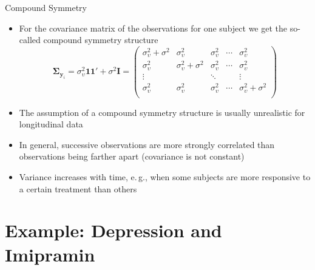 \documentclass[aspectratio=169]{beamer}
\newcommand{\vect}[1]{\mathbf{#1}}
\newcommand{\mat}[1]{\mathbf{#1}}
\newcommand{\gvect}[1]{\boldsymbol{#1}}
\begin{document}
\begin{frame}{Compound Symmetry}
  \begin{itemize}
    \item For the covariance matrix of the observations for
      one subject we get the so-called compound symmetry structure
\[
  \gvect{\Sigma}_{\vect{y}_i} = \sigma^2_\upsilon \vect{1} \vect{1}'
    + \sigma^2 \mat{I}
  = 
  \begin{pmatrix}
    \sigma^2_\upsilon + \sigma^2 & \sigma^2_\upsilon & \sigma^2_\upsilon &
      \cdots & \sigma^2_\upsilon \\
    \sigma^2_\upsilon & \sigma^2_\upsilon  + \sigma^2 & \sigma^2_\upsilon &
      \cdots & \sigma^2_\upsilon \\
    \vdots & & \ddots & & \vdots \\
    \sigma^2_\upsilon & \sigma^2_\upsilon  & \sigma^2_\upsilon &
      \cdots & \sigma^2_\upsilon + \sigma^2 \\
  \end{pmatrix}
\]
    \item The assumption of a compound symmetry structure is usually
      unrealistic for longitudinal data
    \item In general, successive observations are more strongly correlated
      than observations being farther apart (covariance is not constant)
    \item Variance increases with time, e.\,g., when some subjects are more
      responsive to a certain treatment than others
  \end{itemize}
\end{frame}

\section{Example: Depression and Imipramin}
\end{document}
